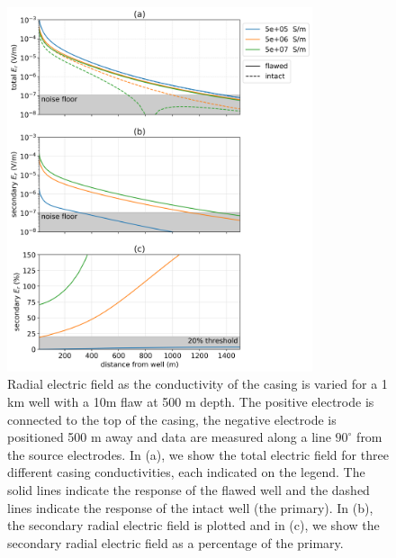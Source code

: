 \begin{figure}
    \begin{center}
    \includegraphics[width=0.8\textwidth]{figures/integrity_conductivity_casing.png}
    \end{center}
\caption{
    Radial electric field as the conductivity of the casing is varied for a 1 km well with a 10m flaw at 500 m depth.
    The positive electrode is connected to the top of the casing, the negative electrode
    is positioned 500 m away and data are measured along a line $90^\circ$ from the
    source electrodes. In (a), we show the total electric field for three different casing conductivities,
    each indicated on the legend. The solid lines indicate the response of the flawed well and the dashed lines indicate the response of the intact well (the primary).
    In (b), the secondary radial electric field is plotted and in (c), we show the
    secondary radial electric field as a percentage of the primary.
}
\label{fig:integrity_conductivity_casing}
\end{figure}
